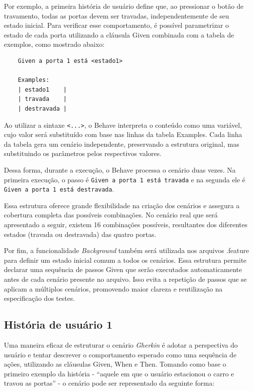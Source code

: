 Por exemplo, a primeira história de usuário define que, ao pressionar o botão de travamento, todas as portas devem ser travadas, independentemente de seu estado 
inicial. Para verificar esse comportamento, é possível parametrizar o estado de cada porta utilizando a cláusula Given combinada com a tabela de exemplos, 
como mostrado abaixo:

\begin{verbatim}
    Given a porta 1 está <estado1>
    
    Examples:
    | estado1    |
    | travada    |
    | destravada |
\end{verbatim}


Ao utilizar a sintaxe \texttt{<...>}, o Behave interpreta o conteúdo como uma variável, cujo valor será substituído com base nas linhas da tabela Examples. Cada 
linha da tabela gera um cenário independente, preservando a estrutura original, mas substituindo os parâmetros pelos respectivos valores.

Dessa forma, durante a execução, o Behave processa o cenário duas vezes. Na primeira execução, o passo é \texttt{Given a porta 1 está travada} e na segunda 
ele é \texttt{Given a porta 1 está destravada}.

Essa estrutura oferece grande flexibilidade na criação dos cenários e assegura a cobertura completa das possíveis combinações. No cenário real que será apresentado 
a seguir, existem 16 combinações possíveis, resultantes dos diferentes estados (travada ou destravada) das quatro portas.

Por fim, a funcionalidade \textit{Background} também será utilizada nos arquivos .feature para definir um estado inicial comum a todos os cenários. Essa estrutura permite 
declarar uma sequência de passos Given que serão executados automaticamente antes de cada cenário presente no arquivo. Isso evita a repetição de passos que se 
aplicam a múltiplos cenários, promovendo maior clareza e reutilização na especificação dos testes.

\subsection{História de usuário 1}

Uma maneira eficaz de estruturar o cenário \textit{Gherkin} é adotar a perspectiva do usuário e tentar descrever o comportamento esperado como uma sequência de ações, 
utilizando as cláusulas Given, When e Then. Tomando como base o primeiro exemplo da história - ``aquele em que o usuário estacionou o carro e travou as portas'' - 
o cenário pode ser representado da seguinte forma:

